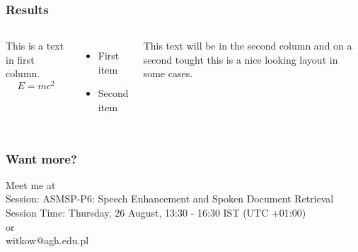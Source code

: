 \documentclass[aspectratio=169]{beamer}
\begin{document}
\begin{frame}
\frametitle{Results}

\begin{columns}

This is a text in first column.
$$E=mc^2$$
\begin{itemize}
\item First item
\item Second item
\end{itemize}

This text will be in the second column
and on a second tought this is a nice looking
layout in some cases.
\end{columns}
\end{frame}
\begin{frame}
\frametitle{Want more?}

\centering
Meet me at \\

Session: ASMSP-P6: Speech Enhancement and Spoken Document Retrieval\\
Session Time: Thursday, 26 August, 13:30 - 16:30 IST (UTC +01:00)\\
or\\
witkow@agh.edu.pl

\end{frame}
\end{document}

